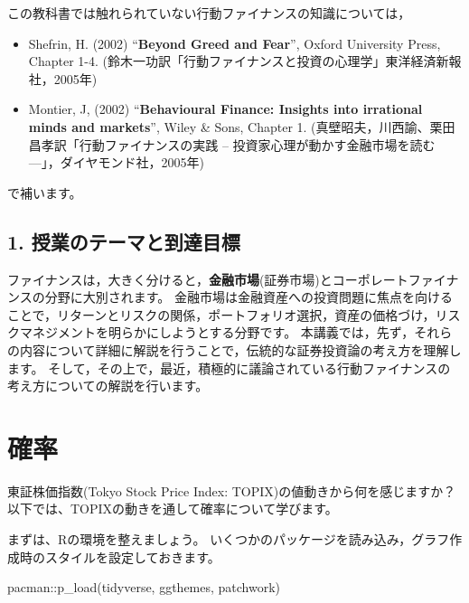\documentclass[
  letterpaper,
  pandoc,
  ja=standard,
  jafont = hiragino-pron]{ltjsbook}
\newenvironment{Shaded}{\begin{snugshade}}{\end{snugshade}}
\newcommand{\FunctionTok}[1]{\textcolor[rgb]{0.28,0.35,0.67}{#1}}
\newcommand{\NormalTok}[1]{\textcolor[rgb]{0.00,0.23,0.31}{#1}}
\newcommand{\SpecialCharTok}[1]{\textcolor[rgb]{0.37,0.37,0.37}{#1}}
\providecommand{\tightlist}{%
  \setlength{\itemsep}{0pt}\setlength{\parskip}{0pt}}\usepackage{longtable,booktabs,array}
\begin{document}
この教科書では触れられていない行動ファイナンスの知識については，

\begin{itemize}
\tightlist
\item
  Shefrin, H. (2002) ``\textbf{Beyond Greed and Fear}'', Oxford
  University Press, Chapter 1-4.
  (鈴木一功訳「行動ファイナンスと投資の心理学」東洋経済新報社，2005年)
\item
  Montier, J, (2002) ``\textbf{Behavioural Finance: Insights into
  irrational minds and markets}'', Wiley \& Sons, Chapter 1.
  (真壁昭夫，川西諭、栗田昌孝訳「行動ファイナンスの実践 --
  投資家心理が動かす金融市場を読む---」，ダイヤモンド社，2005年)
\end{itemize}

で補います。

\section{1.
授業のテーマと到達目標}\label{ux6388ux696dux306eux30c6ux30fcux30deux3068ux5230ux9054ux76eeux6a19}

ファイナンスは，大きく分けると，\textbf{金融市場}(証券市場)とコーポレートファイナンスの分野に大別されます。
金融市場は金融資産への投資問題に焦点を向けることで，リターンとリスクの関係，ポートフォリオ選択，資産の価格づけ，リスクマネジメントを明らかにしようとする分野です。
本講義では，先ず，それらの内容について詳細に解説を行うことで，伝統的な証券投資論の考え方を理解します。
そして，その上で，最近，積極的に議論されている行動ファイナンスの考え方についての解説を行います。


\chapter{確率}\label{ux78baux7387}

東証株価指数(Tokyo Stock Price Index: TOPIX)の値動きから何を感じますか？
以下では、TOPIXの動きを通して確率について学びます。

まずは、Rの環境を整えましょう。
いくつかのパッケージを読み込み，グラフ作成時のスタイルを設定しておきます。

\begin{Shaded}
\begin{Highlighting}[]
\NormalTok{pacman}\SpecialCharTok{::}\FunctionTok{p\_load}\NormalTok{(tidyverse, ggthemes, patchwork)}
\end{Highlighting}
\end{Shaded}
\end{document}
